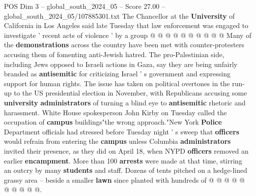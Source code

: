 \begin{textsample}{POS Dim 3 – global\_south\_2024\_05 – Score 27.00 – global\_south\_2024\_05/107885301.txt}
The Chancellor at the \textbf{University} of California in Los Angeles said late Tuesday that law enforcement was engaged to investigate ' recent acts of violence ' by a group @ @ @ @ @ @ @ @ @ @ Many of the \textbf{demonstrations} across the country have been met with counter-protesters accusing them of fomenting anti-Jewish hatred.
The pro-Palestinian side, including Jews opposed to Israeli actions in Gaza, say they are being unfairly branded as \textbf{antisemitic} for criticizing Israel ' s government and expressing support for human rights.
The issue has taken on political overtones in the run-up to the US presidential election in November, with Republicans accusing some \textbf{university} \textbf{administrators} of turning a blind eye to \textbf{antisemitic} rhetoric and harassment.
White House spokesperson John Kirby on Tuesday called the occupation of \textbf{campus} buildings"the wrong approach."New York \textbf{Police} Department officials had stressed before Tuesday night ' s sweep that \textbf{officers} would refrain from entering the \textbf{campus} unless Columbia \textbf{administrators} invited their presence, as they did on April 18, when NYPD \textbf{officers} removed an earlier \textbf{encampment}.
More than 100 \textbf{arrests} were made at that time, stirring an outcry by many \textbf{students} and staff.
Dozens of tents pitched on a hedge-lined grassy area -- beside a smaller \textbf{lawn} since planted with hundreds of @ @ @ @ @ @ @ @ @ @.

\end{textsample}
